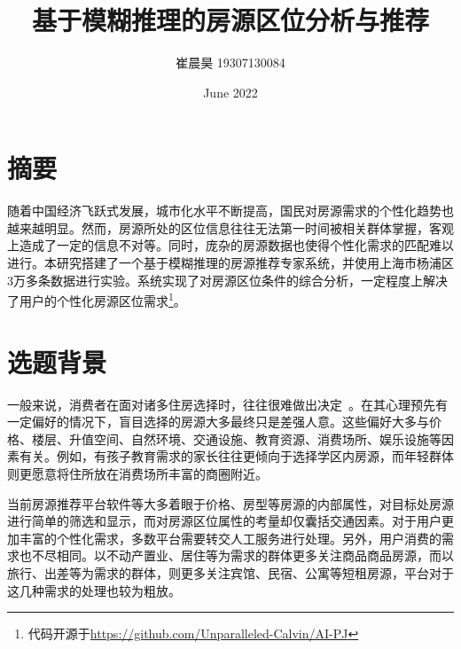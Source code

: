 \documentclass{article}
\title{基于模糊推理的房源区位分析与推荐}
\author{崔晨昊 19307130084}
\date{June 2022}
\begin{document}
\maketitle

\section{摘要}

随着中国经济飞跃式发展，城市化水平不断提高，国民对房源需求的个性化趋势也越来越明显。然而，房源所处的区位信息往往无法第一时间被相关群体掌握，客观上造成了一定的信息不对等。同时，庞杂的房源数据也使得个性化需求的匹配难以进行。本研究搭建了一个基于模糊推理的房源推荐专家系统，并使用上海市杨浦区3万多条数据进行实验。系统实现了对房源区位条件的综合分析，一定程度上解决了用户的个性化房源区位需求\footnote{代码开源于\href{https://github.com/Unparalleled-Calvin/AI-PJ}{https://github.com/Unparalleled-Calvin/AI-PJ}}。

\section{选题背景}

一般来说，消费者在面对诸多住房选择时，往往很难做出决定~\cite{bg}。在其心理预先有一定偏好的情况下，盲目选择的房源大多最终只是差强人意。这些偏好大多与价格、楼层、升值空间、自然环境、交通设施、教育资源、消费场所、娱乐设施等因素有关。例如，有孩子教育需求的家长往往更倾向于选择学区内房源，而年轻群体则更愿意将住所放在消费场所丰富的商圈附近。

当前房源推荐平台软件等大多着眼于价格、房型等房源的内部属性，对目标处房源进行简单的筛选和显示，而对房源区位属性的考量却仅囊括交通因素。对于用户更加丰富的个性化需求，多数平台需要转交人工服务进行处理。另外，用户消费的需求也不尽相同。以不动产置业、居住等为需求的群体更多关注商品商品房源，而以旅行、出差等为需求的群体，则更多关注宾馆、民宿、公寓等短租房源，平台对于这几种需求的处理也较为粗放。
\end{document}
